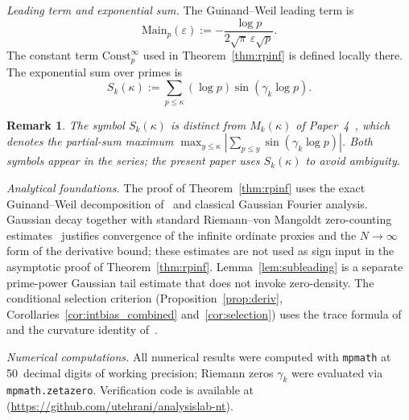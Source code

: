 \documentclass[11pt]{article}
\newtheorem*{remark}{Remark}
\begin{document}
\emph{Leading term and exponential sum.}
The Guinand--Weil leading term is
\[
\mathrm{Main}_p(\varepsilon):=
-\frac{\log p}{2\sqrt{\pi}\,\varepsilon\sqrt{p}}.
\]
The constant term $\mathrm{Const}_p^\infty$ used in
Theorem~\ref{thm:rpinf} is defined locally there.
The exponential sum over primes is
\[
S_k(\kappa):=\sum_{p\le\kappa}(\log p)\sin(\gamma_k\log p).
\]
\begin{remark}
The symbol $S_k(\kappa)$ is distinct from $M_k(\kappa)$ of
Paper~4~\cite{Paper4}, which denotes the partial-sum maximum
$\max_{y\le\kappa}|\sum_{p\le y}\sin(\gamma_k\log p)|$.
Both symbols appear in the series; the present paper uses
$S_k(\kappa)$ to avoid ambiguity.
\end{remark}

\medskip
\emph{Analytical foundations.}
The proof of Theorem~\ref{thm:rpinf} uses the exact Guinand--Weil
decomposition of~\cite{Paper6} and classical Gaussian Fourier analysis.
Gaussian decay together with standard Riemann--von Mangoldt zero-counting
estimates~\cite[Thm.\,5.8]{IwaniecKowalski04} justifies convergence of
the infinite ordinate proxies and the $N\to\infty$ form of the
derivative bound; these estimates are not used as sign input in the
asymptotic proof of Theorem~\ref{thm:rpinf}.
Lemma~\ref{lem:subleading} is a separate prime-power Gaussian tail
estimate that does not invoke zero-density.
The conditional selection criterion (Proposition~\ref{prop:deriv},
Corollaries~\ref{cor:intbias_combined} and~\ref{cor:selection})
uses the trace formula of~\cite{Paper5}
and the curvature identity of~\cite{Paper6}.

\medskip
\emph{Numerical computations.}
All numerical results were computed with \texttt{mpmath} at 50~decimal
digits of working precision; Riemann zeros $\gamma_k$ were evaluated
via \texttt{mpmath.zetazero}.
Verification code is available at~\cite{Code}
(\url{https://github.com/utehrani/analysislab-nt}).
\end{document}

